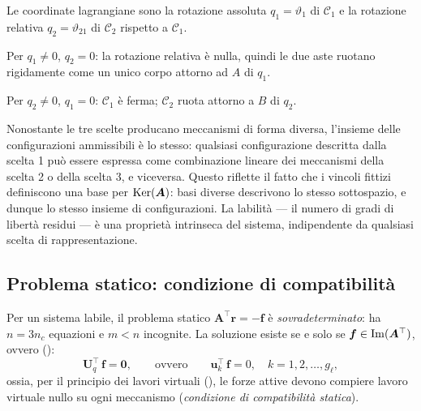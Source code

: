 \begin{esempio}
\begin{svolgimento}
		Le coordinate lagrangiane sono la rotazione assoluta
		$q_1 = \vartheta_1$ di $\mathcal{C}_1$ e la rotazione
		relativa $q_2 = \vartheta_{21}$ di $\mathcal{C}_2$
		rispetto a $\mathcal{C}_1$.
		
		Per $q_1 \neq 0$, $q_2 = 0$: la rotazione relativa
		è nulla, quindi le due aste ruotano rigidamente come
		un unico corpo attorno ad $A$ di $q_1$.
		
		Per $q_2 \neq 0$, $q_1 = 0$: $\mathcal{C}_1$ è
		ferma; $\mathcal{C}_2$ ruota attorno a $B$ di $q_2$.
		
		\vspace{6pt}
		
		Nonostante le tre scelte producano meccanismi di
		forma diversa, l'insieme delle configurazioni
		ammissibili è lo stesso: qualsiasi configurazione
		descritta dalla scelta 1 può essere espressa come
		combinazione lineare dei meccanismi della scelta 2
		o della scelta 3, e viceversa. Questo riflette il
		fatto che i vincoli fittizi definiscono una base
		per $\operatorname{Ker}(\bm{A})$: basi diverse descrivono lo
		stesso sottospazio, e dunque lo stesso insieme di
		configurazioni. La labilità --- il numero di gradi
		di libertà residui --- è una proprietà intrinseca
		del sistema, indipendente da qualsiasi scelta di
		rappresentazione.		
	\end{svolgimento}
\end{esempio}



\subsection{Problema statico: condizione di compatibilità}
\label{sec:labile_stat}

Per un sistema labile, il problema statico $\bm{A}^{\top}\bm{r} =
-\bm{f}$ è \emph{sovradeterminato}: ha $n = 3n_c$ equazioni e $m < n$
incognite. La soluzione esiste se e solo se
$\bm{f} \in \operatorname{Im}(\bm{A}^{\top})$,
ovvero ():
\begin{equation}\label{eq:compat_stat}
	\bm{U}_q^{\top}\,\bm{f} = \bm{0},
	\qquad\text{ovvero}\qquad
	\bm{u}_k^{\top}\,\bm{f} = 0,
	\quad k = 1, 2, \ldots, g_\ell,
\end{equation}
ossia, per il principio dei lavori virtuali (),
le forze attive devono compiere lavoro virtuale nullo su ogni
meccanismo (\emph{condizione di compatibilità statica}).


